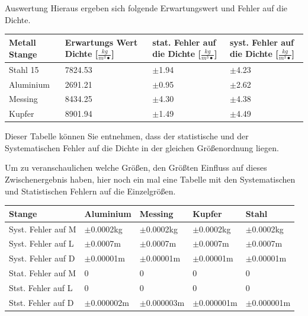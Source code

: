\documentclass[twoside]{protokoll}
\begin{document}
\begin{aufgabe}{Auswertung}
Hieraus ergeben sich folgende Erwartungswert und Fehler auf die Dichte. 


 \begin{table}[H]
        \centering
        \begin{tabularx}{1\textwidth}{X X X X} %
            \toprule
            \textbf{Metall Stange} & \textbf{Erwartungs Wert Dichte [$\frac{kg}{m^3•}$]} & \textbf{stat. Fehler auf die Dichte [$\frac{kg}{m^3•}$]} & \textbf{syst. Fehler auf die Dichte [$\frac{kg}{m^3•}$]}\\
            \midrule
            Stahl 15 & 7824.53 & $\pm$1.94 & $\pm$4.23 \\
            Aluminium & 2691.21 & $\pm$0.95 & $\pm$2.62 \\
            Messing & 8434.25 & $\pm$4.30 & $\pm$4.38 \\
            Kupfer & 8901.94 & $\pm$1.49 & $\pm$4.49\\
            \bottomrule
        \end{tabularx}
        \label{tab:mytable}
    \end{table}

Dieser Tabelle können Sie entnehmen, dass der statistische und der Systematischen Fehler auf die Dichte in der gleichen Größenordnung liegen. 

Um zu veranschaulichen welche Größen, den Größten Einfluss auf dieses Zwischenergebnis haben, hier noch ein mal eine Tabelle mit den Systematischen 
und Statistischen Fehlern auf die Einzelgrößen. 

 \begin{table}[H]
        \centering
        \begin{tabularx}{1\textwidth}{l X X X X} %
            \toprule
            \textbf{Stange} & \textbf{Aluminium} & \textbf{Messing} & \textbf{Kupfer} & \textbf{Stahl} \\
            \midrule
            Syst. Fehler auf M & $\pm$0.0002kg & $\pm$0.0002kg & $\pm$0.0002kg & $\pm$0.0002kg \\
            Syst. Fehler auf L & $\pm$0.0007m & $\pm$0.0007m & $\pm$0.0007m & $\pm$0.0007m \\
            Syst. Fehler auf D & $\pm$0.00001m & $\pm$0.00001m & $\pm$0.00001m & $\pm$0.00001m \\

            \midrule
            Stat. Fehler auf M & 0 & 0 & 0 & 0 \\
            Stst. Fehler auf L & 0 & 0 & 0 & 0 \\
            Stst. Fehler auf D & $\pm$0.000002m & $\pm$0.000003m & $\pm$0.000001m & $\pm$0.000001m \\
           

\end{tabularx}
\end{table}
\end{aufgabe}
\end{document}
